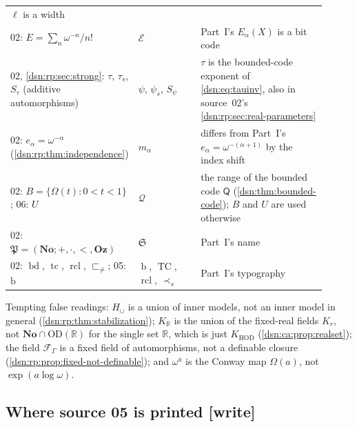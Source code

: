 \documentclass[11pt,a4paper]{article}
\numberwithin{equation}{section}
\theoremstyle{definition}
\theoremstyle{remark}
\newcommand{\No}{\mathbf{No}}
\newcommand{\Oz}{\mathbf{Oz}}
\newcommand{\OD}{\mathrm{OD}}
\newcommand{\HOD}{\mathrm{HOD}}
\newcommand{\R}{\mathbb R}
\newcommand{\bd}{\operatorname{b}}
\newcommand{\TC}{\operatorname{TC}}
\newcommand{\RC}{\operatorname{rcl}}
\newcommand{\Mc}{\mathsf Q}
\newcommand{\KH}{K_{\HOD}}
\newcommand{\ps}{\mathrel{\prec_s}}
\newcommand{\writetag}{\textup{\textsf{\small[write]}}}
\newcommand{\KR}{K_{\R}}
\newcommand{\Hcup}{H_{\cup}}
\newcommand{\Qrange}{\mathcal Q}
\begin{document}
{\begin{longtable}{@{}P{0.27\linewidth}P{0.22\linewidth}P{0.42\linewidth}@{}}
$\ell$ is a width\\
02: $E=\sum_n\omega^{-n}/n!$ & $\mathcal E$ & Part~I's $E_\alpha(X)$ is a bit
code\\
02, \cref{dsn:rp:sec:strong}: $\tau$, $\tau_s$, $S_\tau$ (additive
automorphisms) & $\psi$, $\psi_s$, $S_\psi$ & $\tau$ is the bounded-code
exponent of \eqref{dsn:eq:tauinv}, also in source~02's
\cref{dsn:rp:sec:real-parameters}\\
02: $e_\alpha=\omega^{-\alpha}$ (\cref{dsn:rp:thm:independence}) &
$m_\alpha$ & differs from Part~I's $e_\alpha=\omega^{-(\alpha+1)}$ by the
index shift\\
02: $B=\{\Omega(t):0<t<1\}$; 06: $U$ & $\Qrange$ & the range of the bounded
code $\Mc$ (\cref{dsn:thm:bounded-code}); $B$ and $U$ are used otherwise\\
02: $\mathfrak P=(\No;+,\cdot,<,\Oz)$ & $\mathfrak S$ & Part~I's name\\
02: $\operatorname{bd}$, $\operatorname{tc}$, $\operatorname{rcl}$,
$\sqsubset_{\neq}$; 05: $\mathrm b$ & $\bd$, $\TC$, $\RC$, $\ps$ & Part~I's
typography\\
\bottomrule
\end{longtable}}
Tempting false readings: $\Hcup$ is a union of inner models, not an inner
model in general (\cref{dsn:rp:thm:stabilization}); $\KR$ is the union of the
fixed-real fields $K_r$, not $\No\cap\OD(\R)$ for the single set $\R$, which
is just $\KH$ (\cref{dsn:ca:prop:realset}); the field $\mathcal F_\Gamma$ is
a fixed field of automorphisms, not a definable closure
(\cref{dsn:rp:prop:fixed-not-definable}); and $\omega^a$ is the Conway map
$\Omega(a)$, not $\exp(a\log\omega)$.


\subsection{Where source 05 is printed \writetag}
\label{dsn:rp:sub:corr05}
\end{document}
